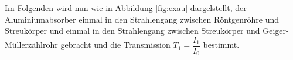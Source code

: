 Im Folgenden wird nun wie in Abbildung \ref{fig:exau} dargelstellt, der Aluminiumabsorber einmal in 
den Strahlengang zwischen Röntgenröhre und Streukörper und einmal in den Strahlengang
zwischen Streukörper und Geiger-Müllerzählrohr gebracht und die Transmission $T_1=\dfrac{I_1}{I_0}$
bestimmt. 


